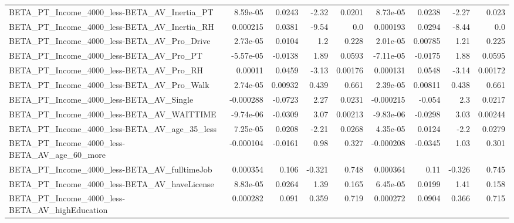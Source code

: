 \begin{tabular}{lrrrrrrrr}
BETA\_PT\_Income\_4000\_less-BETA\_AV\_Inertia\_PT        &    8.59e-05 &       0.0243 &    -2.32 &   0.0201 &   8.73e-05 &      0.0238 &        -2.27 &         0.023 \\
BETA\_PT\_Income\_4000\_less-BETA\_AV\_Inertia\_RH        &    0.000215 &       0.0381 &    -9.54 &      0.0 &   0.000193 &      0.0294 &        -8.44 &           0.0 \\
BETA\_PT\_Income\_4000\_less-BETA\_AV\_Pro\_Drive         &    2.73e-05 &       0.0104 &      1.2 &    0.228 &   2.01e-05 &     0.00785 &         1.21 &         0.225 \\
BETA\_PT\_Income\_4000\_less-BETA\_AV\_Pro\_PT            &   -5.57e-05 &      -0.0138 &     1.89 &   0.0593 &  -7.11e-05 &     -0.0175 &         1.88 &        0.0595 \\
BETA\_PT\_Income\_4000\_less-BETA\_AV\_Pro\_RH            &     0.00011 &       0.0459 &    -3.13 &  0.00176 &   0.000131 &      0.0548 &        -3.14 &       0.00172 \\
BETA\_PT\_Income\_4000\_less-BETA\_AV\_Pro\_Walk          &    2.74e-05 &      0.00932 &    0.439 &    0.661 &   2.39e-05 &     0.00811 &        0.438 &         0.661 \\
BETA\_PT\_Income\_4000\_less-BETA\_AV\_Single            &   -0.000288 &      -0.0723 &     2.27 &   0.0231 &  -0.000215 &      -0.054 &          2.3 &        0.0217 \\
BETA\_PT\_Income\_4000\_less-BETA\_AV\_WAITTIME          &   -9.74e-06 &      -0.0309 &     3.07 &  0.00213 &  -9.83e-06 &     -0.0298 &         3.03 &       0.00244 \\
BETA\_PT\_Income\_4000\_less-BETA\_AV\_age\_35\_less       &    7.25e-05 &       0.0208 &    -2.21 &   0.0268 &   4.35e-05 &      0.0124 &         -2.2 &        0.0279 \\
BETA\_PT\_Income\_4000\_less-BETA\_AV\_age\_60\_more       &   -0.000104 &      -0.0161 &     0.98 &    0.327 &  -0.000208 &     -0.0345 &         1.03 &         0.301 \\
BETA\_PT\_Income\_4000\_less-BETA\_AV\_fulltimeJob       &    0.000354 &        0.106 &   -0.321 &    0.748 &   0.000364 &        0.11 &       -0.326 &         0.745 \\
BETA\_PT\_Income\_4000\_less-BETA\_AV\_haveLicense       &    8.83e-05 &       0.0264 &     1.39 &    0.165 &   6.45e-05 &      0.0199 &         1.41 &         0.158 \\
BETA\_PT\_Income\_4000\_less-BETA\_AV\_highEducation     &    0.000282 &        0.091 &    0.359 &    0.719 &   0.000272 &      0.0904 &        0.366 &         0.715 \\

\end{tabular}
